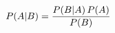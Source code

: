 \documentclass[preview]{standalone}
\begin{document}
\begin{align*}
\special{dvisvgm:raw <g id='unique000'>}P(A|B) = \frac{P(B|A)\,P(A)}{P(B)}\special{dvisvgm:raw </g>}
\end{align*}
\end{document}
